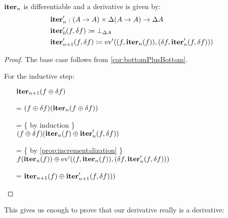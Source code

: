 \begin{prop}
  $\textbf{iter}_n$ is differentiable and a derivative is given by:
  \begin{align*}
    &\textbf{iter}_n' : (A \rightarrow A) \times \Delta (A \rightarrow A) \rightarrow \Delta A\\
    &\textbf{iter}_0' (f, \delta f) \coloneqq \bot_{\Delta A}\\
    &\textbf{iter}_{n+1}' (f, \delta f) \coloneqq \operatorname{ev}'((f, \textbf{iter}_n(f)), (\delta f, \textbf{iter}_n'(f, \delta f)))
  \end{align*}
\end{prop}
\ifproofs
\begin{proof}
  The base case follows from \cref{cor:bottomPlusBottom}.

  For the inductive step:
  \begin{itemize}
    \item[ ]$\textbf{iter}_{n+1}(f \oplus \delta f)$
    \item[=]$(f \oplus \delta f)(\textbf{iter}_{n}(f \oplus \delta f))$
    \item[=]\{ by induction \}\\
      $
      (f \oplus \delta f)(
        \textbf{iter}_{n}(f)
        \oplus \textbf{iter}_{n}'(f, \delta f)
      )
      $
    \item[=]\{ by \cref{prop:incrementalization} \}\\
      $
      f(\textbf{iter}_n(f)) \oplus \operatorname{ev}'((f, \textbf{iter}_{n}(f)), (\delta f,
      \textbf{iter}_{n}'(f, \delta f)))
      $
    \item[=]$
      \textbf{iter}_{n+1}(f) \oplus \textbf{iter}_{n+1}'(f, \delta f)))
      $
  \end{itemize}
\end{proof}
\fi

This gives us enough to prove that our derivative really is a derivative:

